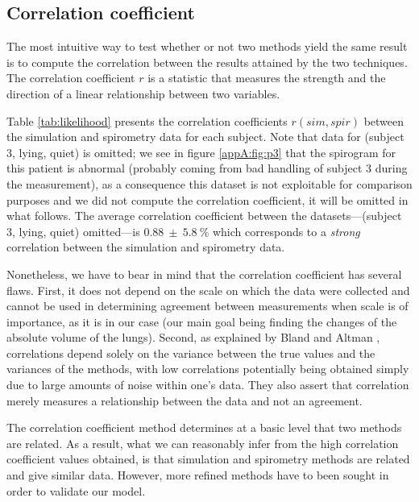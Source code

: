 \subsection{\label{sec:corr_coeff}Correlation coefficient}
The most intuitive way to test whether or not two methods yield the same result is to compute the correlation between the results attained by the two techniques. The correlation coefficient $r$ is a statistic that measures the strength and the direction of a linear relationship between two variables. 

Table \ref{tab:likelihood} presents the correlation coefficients $r(sim,spir)$ between the simulation and spirometry data for each subject. Note that data for (subject 3, lying, quiet) is omitted; we see in figure \ref{appA:fig:p3} that the spirogram for this patient is abnormal (probably coming from bad handling of subject 3 during the measurement), as a consequence this dataset is not exploitable for comparison purposes and we did not compute the correlation coefficient, it will be omitted in what follows. The average correlation coefficient between the datasets---(subject 3, lying, quiet) omitted---is $0.88~\pm~5.8~\%$ which corresponds to a \emph{strong} correlation between the simulation and spirometry data.

Nonetheless, we have to bear in mind that the correlation coefficient has several flaws. First, it does not depend on the scale on which the data were collected and cannot be used in determining agreement between measurements when scale is of importance, as it is in our case (our main goal being finding the changes of the absolute volume of the lungs). Second, as explained by Bland and Altman \cite{altman1983measurement}, correlations depend solely on the variance between the true values and the variances of the methods, with low correlations potentially being obtained simply due to large amounts of noise within one's data. They also assert that correlation merely measures a relationship between the data and not an agreement.

The correlation coefficient method determines at a basic level that two methods are related. As a result, what we can reasonably infer from the high correlation coefficient values obtained, is that simulation and spirometry methods are related and give similar data. However, more refined methods have to been sought in order to validate our model.

